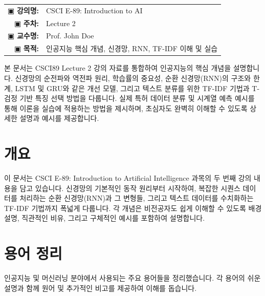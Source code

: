 \documentclass[11pt,a4paper]{article}
\makeatletter
\theoremstyle{definition}
\newcommand{\metainfo}[4]{
\begin{tcolorbox}[
    colback=lightpurple,
    colframe=darkpurple,
    boxrule=1pt,
    arc=2mm,
    left=10pt,
    right=10pt,
    top=8pt,
    bottom=8pt
]
\begin{tabular}{@{}rl@{}}
▣ \textbf{강의명:} & #1 \\[0.3em]
▣ \textbf{주차:} & #2 \\[0.3em]
▣ \textbf{교수명:} & #3 \\[0.3em]
▣ \textbf{목적:} & \begin{minipage}[t]{0.75\textwidth}#4\end{minipage}
\end{tabular}
\end{tcolorbox}
}
\makeatother
\begin{document}
\thispagestyle{firstpage}

\metainfo{CSCI E-89: Introduction to AI}{Lecture 2}{Prof. John Doe}{인공지능 핵심 개념, 신경망, RNN, TF-IDF 이해 및 실습}

\tableofcontents

\newpage

\begin{summarybox}
본 문서는 CSCI89 Lecture 2 강의 자료를 통합하여 인공지능의 핵심 개념을 설명합니다.
신경망의 순전파와 역전파 원리, 학습률의 중요성, 순환 신경망(RNN)의 구조와 한계,
LSTM 및 GRU와 같은 개선 모델, 그리고 텍스트 분류를 위한 TF-IDF 기법과 T-검정 기반 특징 선택 방법을 다룹니다.
실제 특허 데이터 분류 및 시계열 예측 예시를 통해 이론을 실습에 적용하는 방법을 제시하며,
초심자도 완벽히 이해할 수 있도록 상세한 설명과 예시를 제공합니다.
\end{summarybox}

\newpage
\section{개요}
이 문서는 CSCI E-89: Introduction to Artificial Intelligence 과목의 두 번째 강의 내용을 담고 있습니다. 신경망의 기본적인 동작 원리부터 시작하여, 복잡한 시퀀스 데이터를 처리하는 순환 신경망(RNN)과 그 변형들, 그리고 텍스트 데이터를 수치화하는 TF-IDF 기법까지 폭넓게 다룹니다. 각 개념은 비전공자도 쉽게 이해할 수 있도록 배경 설명, 직관적인 비유, 그리고 구체적인 예시를 포함하여 설명합니다.

\newpage
\section{용어 정리}
인공지능 및 머신러닝 분야에서 사용되는 주요 용어들을 정리했습니다. 각 용어의 쉬운 설명과 함께 원어 및 추가적인 비고를 제공하여 이해를 돕습니다.
\end{document}
